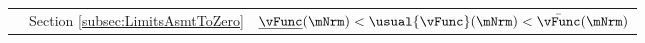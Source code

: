\begin{table}
{\begin{tabular}{|l|l|l|}
        \\                                                                                                                      & Section \ref{subsec:LimitsAsmtToZero}   & $\underline{\vFunc}(\mNrm) < \usual{\vFunc}(\mNrm) < \bar{\vFunc}(\mNrm)$ %


\end{tabular}}
\end{table}
